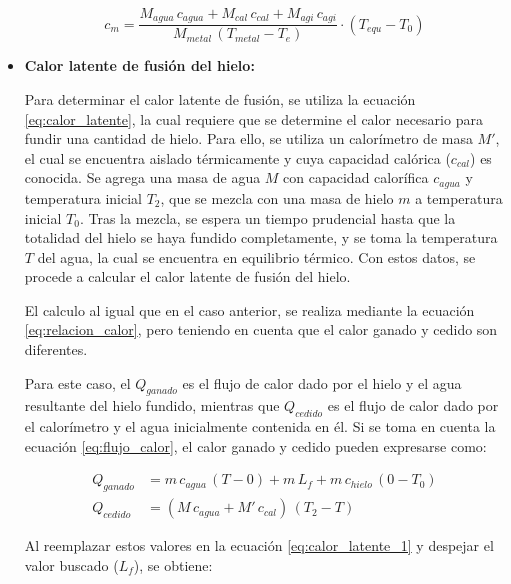 \documentclass[10pt]{article}
\begin{document}
\begin{multicols*}{2}
\begin{itemize}
            \begin{equation*}
                c_{m} = \frac{M_{agua} \, c_{agua} + M_{cal} \, c_{cal} + M_{agi} \, c_{agi}}{M_{metal} \, (T_{metal} - T_{e})} \cdot (T_{equ} - T_{0})
                \label{eq:calor_especifico}
            \end{equation*}

        \item \textbf{Calor latente de fusión del hielo:}

            Para determinar el calor latente de fusión, se utiliza la ecuación \ref{eq:calor_latente}, la cual requiere que se determine el calor necesario para fundir una cantidad de hielo. Para ello, se utiliza un calorímetro de masa $M'$, el cual se encuentra aislado térmicamente y cuya capacidad calórica ($c_{cal}$) es conocida. Se agrega una masa de agua $M$ con capacidad calorífica $c_{agua}$ y temperatura inicial $T_2$, que se mezcla con una masa de hielo $m$ a temperatura inicial $T_0$. Tras la mezcla, se espera un tiempo prudencial hasta que la totalidad del hielo se haya fundido completamente, y se toma la temperatura $T$ del agua, la cual se encuentra en equilibrio térmico. Con estos datos, se procede a calcular el calor latente de fusión del hielo.

            El calculo al igual que en el caso anterior, se realiza mediante la ecuación \ref{eq:relacion_calor}, pero teniendo en cuenta que el calor ganado y cedido son diferentes.

            Para este caso, el $Q_{ganado}$ es el flujo de calor dado por el hielo y el agua resultante del hielo fundido, mientras que $Q_{cedido}$ es el flujo de calor dado por el calorímetro y el agua inicialmente contenida en él. Si se toma en cuenta la ecuación \ref{eq:flujo_calor}, el calor ganado y cedido pueden expresarse como:

            \begin{equation}
                \begin{split}
                    Q_{ganado} &= m \, c_{agua} \, (T - 0) + m \, L_f + m \, c_{hielo} \, (0 - T_0)\\
                    Q_{cedido} &= (M \, c_{agua} + M' \, c_{cal}) \, (T_2 - T)
                \end{split}
                \label{eq:calor_latente_2}
            \end{equation}

            Al reemplazar estos valores en la ecuación \ref{eq:calor_latente_1} y despejar el valor buscado ($L_f$), se obtiene:


\end{itemize}
\end{multicols*}
\end{document}
